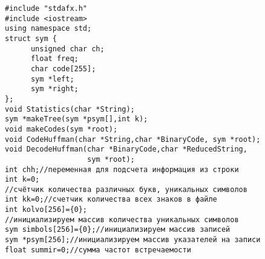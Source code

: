 \begin{lstlisting}[label=code:haff,caption=Програмна реалізація алгоритму Хаффмана]
#include "stdafx.h"
#include <iostream>
using namespace std;
struct sym { 
      unsigned char ch;
      float freq;     
      char code[255];
      sym *left;
      sym *right;
};
void Statistics(char *String);
sym *makeTree(sym *psym[],int k);
void makeCodes(sym *root);
void CodeHuffman(char *String,char *BinaryCode, sym *root);
void DecodeHuffman(char *BinaryCode,char *ReducedString, 
                   sym *root);
int chh;//переменная для подсчета информация из строки
int k=0;
//счётчик количества различных букв, уникальных символов
int kk=0;//счетчик количества всех знаков в файле
int kolvo[256]={0};
//инициализируем массив количества уникальных символов
sym simbols[256]={0};//инициализируем массив записей 
sym *psym[256];//инициализируем массив указателей на записи
float summir=0;//сумма частот встречаемости


\end{lstlisting}
